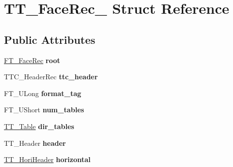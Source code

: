 \hypertarget{struct_t_t___face_rec__}{\section{T\-T\-\_\-\-Face\-Rec\-\_\- Struct Reference}
\label{struct_t_t___face_rec__}
}
\subsection*{Public Attributes}
\begin{DoxyCompactItemize}
\item 
\hypertarget{struct_t_t___face_rec___ab07a1f6ce2cffe73a5501fb33164ae74}{\hyperlink{struct_f_t___face_rec__}{F\-T\-\_\-\-Face\-Rec} {\bfseries root}}\label{struct_t_t___face_rec___ab07a1f6ce2cffe73a5501fb33164ae74}

\item 
\hypertarget{struct_t_t___face_rec___a9cde4ce9550411379eef0791afef8943}{T\-T\-C\-\_\-\-Header\-Rec {\bfseries ttc\-\_\-header}}\label{struct_t_t___face_rec___a9cde4ce9550411379eef0791afef8943}

\item 
\hypertarget{struct_t_t___face_rec___ae492c009d7c3dd1b7279f6596edb84af}{F\-T\-\_\-\-U\-Long {\bfseries format\-\_\-tag}}\label{struct_t_t___face_rec___ae492c009d7c3dd1b7279f6596edb84af}

\item 
\hypertarget{struct_t_t___face_rec___aa32df24e9bbbbc72117bfeb964028b6e}{F\-T\-\_\-\-U\-Short {\bfseries num\-\_\-tables}}\label{struct_t_t___face_rec___aa32df24e9bbbbc72117bfeb964028b6e}

\item 
\hypertarget{struct_t_t___face_rec___ae4480c53c6414c74919fc99c9192adfe}{\hyperlink{struct_t_t___table_rec__}{T\-T\-\_\-\-Table} {\bfseries dir\-\_\-tables}}\label{struct_t_t___face_rec___ae4480c53c6414c74919fc99c9192adfe}

\item 
\hypertarget{struct_t_t___face_rec___ac5fc04850d7b223029891601ed605b34}{T\-T\-\_\-\-Header {\bfseries header}}\label{struct_t_t___face_rec___ac5fc04850d7b223029891601ed605b34}

\item 
\hypertarget{struct_t_t___face_rec___a784d2ca39e9717da0661f5fd59dffc58}{\hyperlink{struct_t_t___hori_header__}{T\-T\-\_\-\-Hori\-Header} {\bfseries horizontal}}\label{struct_t_t___face_rec___a784d2ca39e9717da0661f5fd59dffc58}


\end{DoxyCompactItemize}
